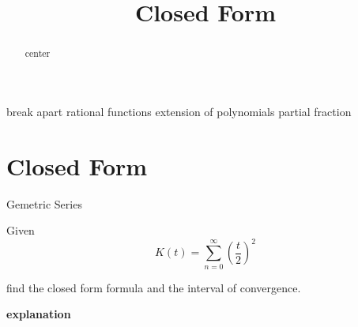 \documentclass{ximera}
\title{Closed Form}
\begin{document}
\begin{abstract}
center
\end{abstract}
\maketitle






break apart rational functions
extension of polynomials
partial fraction



\section{Closed Form}



\begin{example} Gemetric Series


Given 
\[    K(t) =   \sum_{n=0}^{\infty}  \left( \frac{t}{2} \right)^2\]

find the closed form formula and the interval of convergence.




\textbf{\textcolor{purple!50!blue!90!black}{explanation}}



\end{example}
\end{document}
